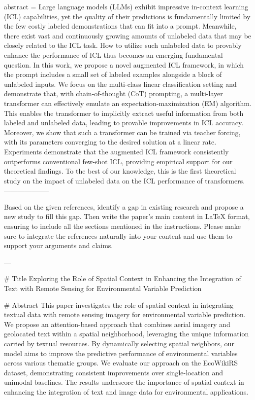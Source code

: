 {      abstract = {Large language models (LLMs) exhibit impressive in-context learning (ICL) capabilities, yet the quality of their predictions is fundamentally limited by the few costly labeled demonstrations that can fit into a prompt. Meanwhile, there exist vast and continuously growing amounts of unlabeled data that may be closely related to the ICL task. How to utilize such unlabeled data to provably enhance the performance of ICL thus becomes an emerging fundamental question. In this work, we propose a novel augmented ICL framework, in which the prompt includes a small set of labeled examples alongside a block of unlabeled inputs. We focus on the multi-class linear classification setting and demonstrate that, with chain-of-thought (CoT) prompting, a multi-layer transformer can effectively emulate an expectation-maximization (EM) algorithm. This enables the transformer to implicitly extract useful information from both labeled and unlabeled data, leading to provable improvements in ICL accuracy. Moreover, we show that such a transformer can be trained via teacher forcing, with its parameters converging to the desired solution at a linear rate. Experiments demonstrate that the augmented ICL framework consistently outperforms conventional few-shot ICL, providing empirical support for our theoretical findings. To the best of our knowledge, this is the first theoretical study on the impact of unlabeled data on the ICL performance of transformers.}
}
        --------------------
        


Based on the given references, identify a gap in existing research and propose a new study to fill this gap. Then write the paper's main content in LaTeX format, ensuring to include all the sections mentioned in the instructions. Please make sure to integrate the references naturally into your content and use them to support your arguments and claims.

---

# Title
Exploring the Role of Spatial Context in Enhancing the Integration of Text with Remote Sensing for Environmental Variable Prediction

# Abstract
This paper investigates the role of spatial context in integrating textual data with remote sensing imagery for environmental variable prediction. We propose an attention-based approach that combines aerial imagery and geolocated text within a spatial neighborhood, leveraging the unique information carried by textual resources. By dynamically selecting spatial neighbors, our model aims to improve the predictive performance of environmental variables across various thematic groups. We evaluate our approach on the EcoWikiRS dataset, demonstrating consistent improvements over single-location and unimodal baselines. The results underscore the importance of spatial context in enhancing the integration of text and image data for environmental applications.

